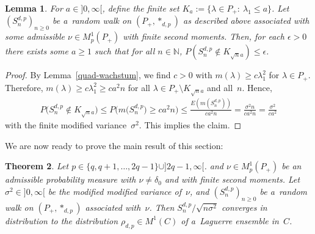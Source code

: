 \documentclass[11pt]{article}
\numberwithin{equation}{section}
\newtheorem{Theorem}{Theorem}[section]
\newtheorem{Lemma}[Theorem]{Lemma}
\begin{document}
\begin{Lemma}
\label{sn-wachstum}
For $a\in{}]0,\infty[$, define the finite set $K_a:=\{\lambda\in P_+:\> \lambda_1\le a\}$.
Let $(S_n^{d,p})_{n\ge0}$ be a~random walk on $(P_+,*_{d,p})$ as described above associated with some admissible $\nu\in
M^1_p(P_+)$ with finite second moments.
Then, for each $\epsilon>0$ there exists some $a\ge1$ such that for all $n\in\mathbb N$, $P(S_n^{d,p}\not\in K_{\sqrt
n  a})\le\epsilon$.
\end{Lemma}

\begin{proof}
By Lemma~\ref{quad-wachstum}, we f\/ind $c>0$ with $m(\lambda)\ge c\lambda_1^2$ for $\lambda\in P_+$.
Therefore, $m(\lambda)\ge c\lambda_1^2\ge ca^2n$ for all $\lambda\in P_+\setminus K_{\sqrt n  a}$ and all~$n$.
Hence,
\begin{gather*}
P\big(S_n^{d,p}\not\in K_{\sqrt n  a}\big)  \le  P\big(m\big(S_n^{d,p}\big)\ge ca^2n\big)   \le   \frac{E(m(S_n^{d,p}))}{ca^2n}
 = \frac{\sigma^2n}{ca^2n}=\frac{\sigma^2}{ca^2}
\end{gather*}
with the f\/inite modif\/ied variance~$\sigma^2$.
This implies the claim.
\end{proof}

We are now ready to prove the main result of this section:

\begin{Theorem}\label{clt}
Let $p\in \{q,q+1,\ldots,2q-1\}\cup]2q-1,\infty[$.
and $\nu\in M^1_p(P_+)$ be an admissible probability measure with $\nu\ne \delta_0$ and with finite second moments.
Let $\sigma^2\in{}]0,\infty[$ be the modified modified variance of~$\nu$, and $(S_n^{d,p})_{n\ge0}$ be a~random walk on
$(P_+,*_{d,p})$ associated with~$\nu$.
Then $ S_n^{d,p}/\sqrt{n\sigma^2}$ converges in distribution to the distribution $\rho_{d,p}\in M^1(C)$ of a~Laguerre
ensemble in~$C$.
\end{Theorem}
\end{document}
